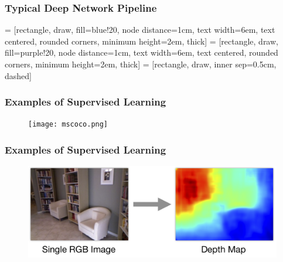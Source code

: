 \documentclass{beamer}
\begin{document}
\begin{frame}
  \frametitle{Typical Deep Network Pipeline}
   = [rectangle, draw, fill=blue!20, node distance=1cm, text width=6em, text centered, rounded corners, minimum height=2em, thick]
   = [rectangle, draw, fill=purple!20, node distance=1cm, text width=6em, text centered, rounded corners, minimum height=2em, thick]
   = [rectangle, draw, inner sep=0.5cm, dashed]

\end{frame}

\begin{frame}
  \frametitle{Examples of Supervised Learning}
  \begin{figure}
    \texttt{[image: mscoco.png]}
  \end{figure}
\end{frame}

\begin{frame}
  \frametitle{Examples of Supervised Learning}
  \begin{figure}
    \includegraphics[width=0.8\linewidth]{depth_prediction.png}
  \end{figure}
\end{frame}



\end{document}
